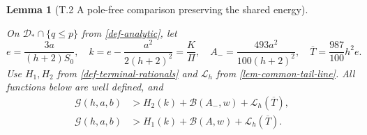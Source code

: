 \documentclass[11pt,a4paper]{article}
\theoremstyle{proofmanuscript}
\newtheorem{lemma}[theorem]{Lemma}
\begin{document}
\begin{lemma}[T.2 A pole-free comparison preserving the shared energy]\label{lem-terminal-comparison}

On \(\mathcal D_*\cap\{q\le p\}\) from \ref{def-analytic}, let \[
e=\frac{3a}{(h+2)S_0},\quad
k=e-\frac{a^2}{2(h+2)^2}=\frac K\Pi,\quad
A_- =\frac{493a^2}{100(h+2)^2},\quad
\overline T=\frac{987}{100}h^2e.
\] Use \(H_1,H_2\) from \ref{def-terminal-rationals} and \(\mathcal L_h\) from \ref{lem-common-tail-line}. All functions below are well defined, and \[
\begin{aligned}
\mathcal G(h,a,b)&>H_2(k)+\mathcal B(A_-,w)+\mathcal L_h(\overline T),\\
\mathcal G(h,a,b)&>H_1(k)+\mathcal B(A,w)+\mathcal L_h(\overline T).
\end{aligned}
\]

\end{lemma}
\end{document}
